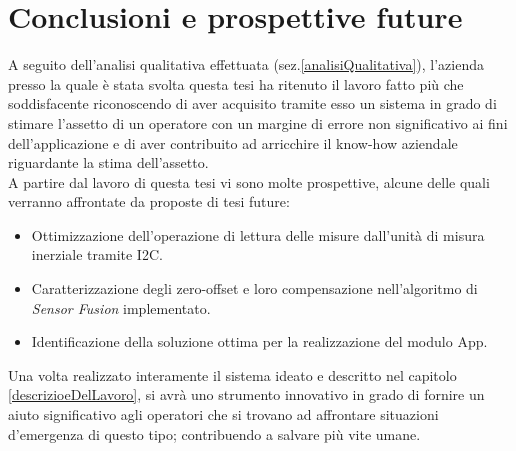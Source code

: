 \chapter{Conclusioni e prospettive future}
\label{conclusioni}
A seguito dell'analisi qualitativa effettuata (sez.\ref{analisiQualitativa}), l'azienda presso la quale è stata svolta questa tesi
 ha ritenuto il lavoro fatto più che soddisfacente riconoscendo di aver acquisito tramite esso un sistema in grado di stimare l'assetto di un operatore con un margine di errore non significativo ai fini dell'applicazione e di aver contribuito ad arricchire il know-how aziendale riguardante la stima dell'assetto.\\
A partire dal lavoro di questa tesi vi sono molte prospettive, alcune delle quali verranno affrontate da proposte di tesi future:
\begin{itemize}
	\item Ottimizzazione dell'operazione di lettura delle misure dall'unità di misura inerziale tramite I2C.
	\item Caratterizzazione degli zero-offset e loro compensazione nell'algoritmo di \textit{Sensor Fusion} implementato.
	\item Identificazione della soluzione ottima per la realizzazione del modulo App.
\end{itemize}

Una volta realizzato interamente il sistema ideato e descritto nel capitolo \ref{descrizioeDelLavoro}, si avrà uno strumento innovativo in grado di fornire un aiuto significativo agli operatori che si trovano ad affrontare situazioni d'emergenza di questo tipo; contribuendo a salvare più vite umane.